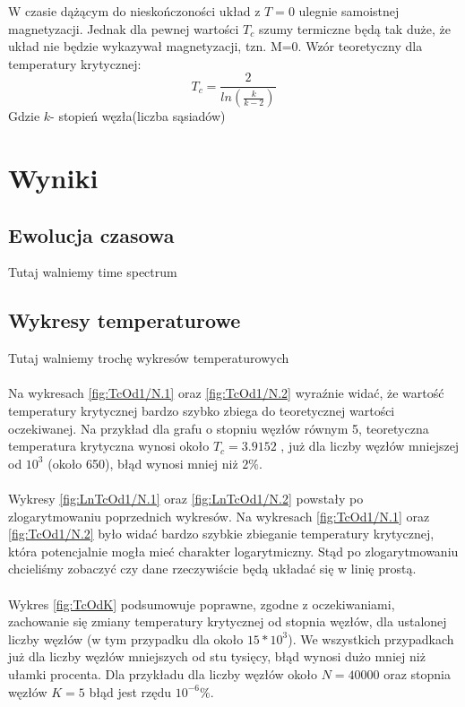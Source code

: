 \documentclass[12pt,a4paper]{article}
\begin{document}
W czasie dążącym do nieskończoności układ z $T=0$ ulegnie samoistnej magnetyzacji. Jednak dla pewnej wartości $T_c$ szumy termiczne będą tak duże, że układ nie będzie wykazywał magnetyzacji, tzn. M=0. Wzór teoretyczny dla temperatury krytycznej:
$$ T_{c}=\frac{2}{ln(\frac{k}{k-2})} $$
Gdzie $k$- stopień węzła(liczba sąsiadów)

\section{Wyniki}
\subsection{Ewolucja czasowa}
Tutaj walniemy time spectrum
\subsection{Wykresy temperaturowe}
Tutaj walniemy trochę wykresów temperaturowych

\paragraph{}
Na wykresach \ref{fig:TcOd1/N.1} oraz \ref{fig:TcOd1/N.2} wyraźnie widać, że wartość temperatury krytycznej bardzo szybko zbiega do teoretycznej wartości oczekiwanej. Na przykład dla grafu o stopniu węzłów równym 5, teoretyczna temperatura krytyczna wynosi około $T_{c} = 3.9152$ , już dla liczby węzłów mniejszej od $10^3$ (około 650), błąd wynosi mniej niż $2\%$.

\paragraph{}
Wykresy \ref{fig:LnTcOd1/N.1} oraz \ref{fig:LnTcOd1/N.2} powstały po zlogarytmowaniu poprzednich wykresów. Na wykresach \ref{fig:TcOd1/N.1} oraz \ref{fig:TcOd1/N.2} było widać bardzo szybkie zbieganie temperatury krytycznej, która potencjalnie mogła mieć charakter logarytmiczny. Stąd po zlogarytmowaniu chcieliśmy zobaczyć czy dane rzeczywiście będą układać się w linię prostą.

\paragraph{}
Wykres \ref{fig:TcOdK} podsumowuje poprawne, zgodne z oczekiwaniami, zachowanie się zmiany temperatury krytycznej od stopnia węzłów, dla ustalonej liczby węzłów (w tym przypadku dla około $15*10^3$). We wszystkich przypadkach już dla liczby węzłów mniejszych  od stu tysięcy, błąd wynosi dużo mniej niż ułamki procenta. Dla przykładu dla liczby węzłów około $N = 40000$ oraz stopnia węzłów $K=5$ błąd jest rzędu $10^{-6}\%$.
\end{document}
